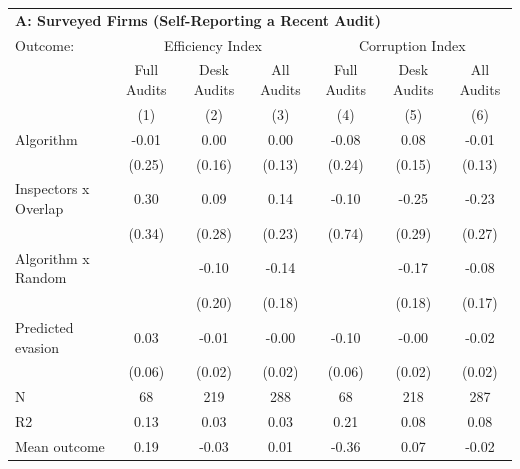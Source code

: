 \begin{tabular}{lccc|ccc} \toprule
\multicolumn{7}{l}{\textbf{A: Surveyed Firms (Self-Reporting a Recent Audit)}} \\ \multicolumn{1}{l}{Outcome:} & \multicolumn{3}{c}{Efficiency Index} & \multicolumn{3}{c}{Corruption Index} \\ \multicolumn{1}{l}{} & Full Audits & Desk Audits & All Audits & Full Audits & Desk Audits & All Audits \\ \multicolumn{1}{l}{} & (1) & (2) & (3) & (4) & (5) & (6) \\ \midrule
Algorithm   &       -0.01         &        0.00         &        0.00         &       -0.08         &        0.08         &       -0.01         \\
            &      (0.25)         &      (0.16)         &      (0.13)         &      (0.24)         &      (0.15)         &      (0.13)         \\
\addlinespace
Inspectors x Overlap&        0.30         &        0.09         &        0.14         &       -0.10         &       -0.25         &       -0.23         \\
            &      (0.34)         &      (0.28)         &      (0.23)         &      (0.74)         &      (0.29)         &      (0.27)         \\
\addlinespace
Algorithm x Random&                     &       -0.10         &       -0.14         &                     &       -0.17         &       -0.08         \\
            &                     &      (0.20)         &      (0.18)         &                     &      (0.18)         &      (0.17)         \\
\addlinespace
Predicted evasion&        0.03         &       -0.01         &       -0.00         &       -0.10\sym{*}  &       -0.00         &       -0.02         \\
            &      (0.06)         &      (0.02)         &      (0.02)         &      (0.06)         &      (0.02)         &      (0.02)         \\
\midrule
N           &          68         &         219         &         288         &          68         &         218         &         287         \\
R2          &        0.13         &        0.03         &        0.03         &        0.21         &        0.08         &        0.08         \\
Mean outcome&        0.19         &       -0.03         &        0.01         &       -0.36         &        0.07         &       -0.02         \\


\end{tabular}
